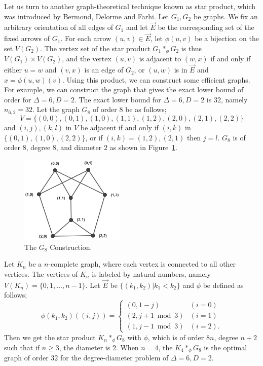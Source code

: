 \documentclass[conference]{IEEEtran}
\begin{document}
Let us turn to another graph-theoretical technique known as star product, which was introduced by Bermond, Delorme and Farhi\cite{bermond1982large,MilSir2005}.
Let $G_1, G_2$ be graphs.
We fix an arbitrary orientation of all edges of $G_1$ and let $\vec{E}$ be the corresponding set of the fixed arrows of $G_1$.
For each arrow $(u,v) \in \vec{E}$, let $\phi(u,v)$ be a bijection on the set $V(G_2)$.
The vertex set of the star product $G_1 *_\phi G_2$ is thus $V(G_1) \times V(G_2)$,
and the vertex $(u, v)$ is adjacent to $(w, x)$ if and only if either $u = w$ and $(v,x)$ is an edge of $G_2$, or
$(u, w)$ is in $\vec{E}$ and $x=\phi(u,w)(v)$.
Using this product, we can construct some efficient graphs.
For example, we can construct the graph that gives the exact lower bound of order for $\Delta=6, D=2$.
The exact lower bound for $\Delta=6, D=2$ is 32, namely $n_{6,2} = 32$.
Let the graph $G_8$ of order $8$ be as follows;
\[ V=\{(0,0),(0,1),(1,0),(1,1),(1,2),(2,0),(2,1),(2,2)\} \]
and $(i,j), (k,l)$ in $V$ be adjacent if and only if
$(i,k)$ in $\{ (0,1),(1,0),(2,2)\}$, or if $(i,k)=(1,2),(2,1)$ then $j=l$.
$G_8$ is of order $8$, degree $8$, and diameter $2$ as shown in Figure~\ref{fig:g8}.
\begin{figure}[]
\centering
\includegraphics[width=5cm]{g8.png}
\caption{ The $G_8$ Construction.}
\label{fig:g8}
\end{figure}
Let $K_n$ be a $n$-complete graph, where each vertex is connected to all other vertices.
The vertices of $K_n$ is labeled by natural numbers, namely $V(K_n)=\{0,1,\ldots, n-1\}$.
Let $\vec{E}$ be $\{(k_1,k_2)| k_1 < k_2\}$ and $\phi$ be defined as follows;
\[
  \phi(k_1,k_2)((i,j)) =
    \begin{cases}
      (0,1-j) & (i=0) \\
      (2,j+1 \bmod 3) & (i=1) \\
      (1,j-1 \bmod 3) & (i=2).
    \end{cases}
\]
Then we get the star product $K_n *_\phi G_8$ with $\phi$, which is of order $8n$, degree $n+2$ such that if $n \geq 3$, the diameter is $2$.
When $n=4$, the $K_4 *_\phi G_8$ is the optimal graph of order $32$ for the degree-diameter problem of $\Delta=6, D=2$.
\end{document}
